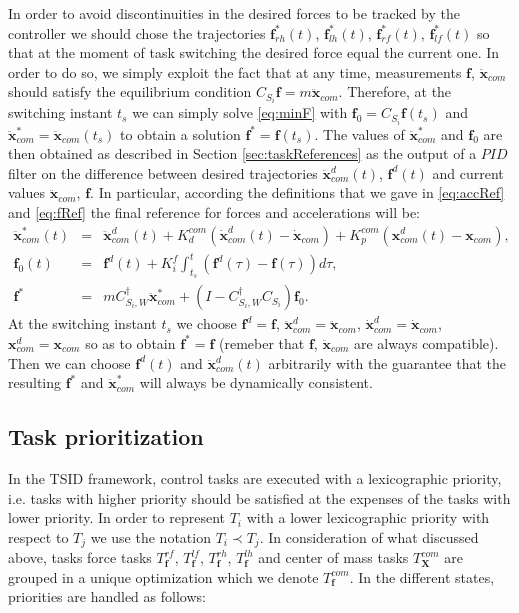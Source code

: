 \documentclass[12pt,a4paper,twoside]{article}
\begin{document}
In order to avoid discontinuities in the desired forces to be tracked by the controller we should chose the trajectories ${{\bm f}}_{rh}^*(t)$, ${{\bm f}}_{lh}^*(t)$, ${{\bm f}}_{rf}^*(t)$, ${{\bm f}}_{lf}^*(t)$ so that at the moment of task switching the desired force equal the current one. In order to do so, we simply exploit the fact that at any time, measurements $\bm f$, $ \ddot {\bm x}_{com}$ should satisfy the equilibrium condition $C_{S_i} \bm f = m \ddot {\bm x}_{com}$. Therefore, at the switching instant $t_s$ we can simply solve \eqref{eq:minF} with $\bm f_0 = C_{S_i} \bm f (t_s) $ and $\ddot {\bm x}^*_{com} = \ddot {\bm x}_{com}(t_s)$ to obtain a solution $\bm f^* = \bm f (t_s)$. The values of $\ddot {\bm x}^*_{com}$ and $\bm f_0$ are then obtained as described in Section \ref{sec:taskReferences} as the output of a $PID$ filter on the difference between desired trajectories $\ddot {\bm x}^d_{com} (t)$, $\bm f^d(t)$ and current values $\ddot {\bm x}_{com}$, $\bm f$. In particular, according the definitions that we gave in \eqref{eq:accRef} and \eqref{eq:fRef} the final reference for forces and accelerations will be:
\begin{eqnarray*} 
\ddot {\bm x}_{com}^* (t) &=& \ddot {\bm x}_{com}^d (t) + K_d^{com} \left( \dot {\bm x}_{com}^d (t) - \dot {\bm x}_{com}\right) + K_p^{com} \left( {\bm x}_{com}^d (t) - {\bm x}_{com}\right), \\
{\bm f}_0 (t) & = & {\bm f}^d (t) + K_i^f \int_{t_s}^t \left( {\bm f}^d (\tau) - {\bm f} (\tau) \right) d \tau,\\
\bm f^* & =&  m  C_{S_i, W}^\dagger \ddot {{\bm x}}_{com}^*+ (I - C_{S_i, W}^\dagger C_{S_i}) \bm f_0.
\end{eqnarray*}
At the switching instant $t_s$ we choose $\bm f^d = \bm f $, $\ddot {\bm x}^d_{com} = \ddot {\bm x}_{com}$, $\dot {\bm x}^d_{com} = \dot {\bm x}_{com}$, $ {\bm x}^d_{com} = {\bm x}_{com}$ so as to obtain $\bm f^* = \bm f$ (remeber that $\bm f$, $ \ddot {\bm x}_{com}$ are always compatible). Then we can choose $\bm f^d (t)$ and $\ddot {\bm x}^d_{com}(t)$ arbitrarily with the guarantee that the resulting $\bm f^*$ and $\ddot {\bm x}_{com}^*$ will always be dynamically consistent.

\subsection{Task prioritization} \label{sec:taskPrioritization}

In the TSID framework, control tasks are executed with a lexicographic priority, i.e. tasks with higher priority should be satisfied at the expenses of the tasks with lower priority. In order to represent $T_i$ with a lower lexicographic priority with respect to $T_j$ we use the notation $T_i \prec T_j$. In consideration of what discussed above, tasks force tasks $T^{rf}_{\bm f}$, $T^{lf}_{\bm f}$, $T^{rh}_{\bm f}$, $T^{lh}_{\bm f}$ and center of mass tasks $T^{com}_{\bm X}$ are grouped in a unique optimization which we denote $T^{com}_{\bm f}$. In the different states, priorities are handled as follows:
\end{document}
